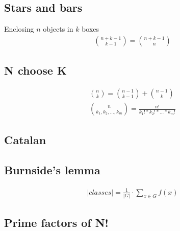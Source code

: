 \subsection{Stars and bars}
Enclosing $n$ objects in $k$ boxes
\begin{gather*}
\binom{n + k - 1}{k - 1} = \binom{n + k - 1}{n}
\end{gather*}
\vspace{-15pt}

\subsection{N choose K}
\vspace{-7pt}
\begin{gather*}
\binom{n}{k} = \binom{n - 1}{k - 1} + \binom{n - 1}{k} \\
\binom{n}{k_1, k_2, ..., k_m} = \frac{n!}{k_1! * k_2! * ... * k_m!}
\end{gather*}

\vspace{-15pt}

\subsection{Catalan}

\subsection{Burnside's lemma}
\begin{gather*}
|classes| = \frac{1}{|G|} \cdot \sum_{x \in G} f(x)  
\end{gather*}

\subsection{Prime factors of N!}
